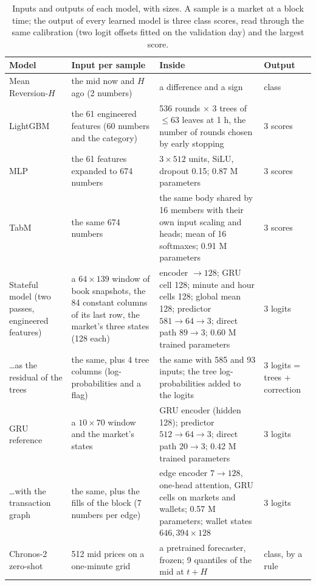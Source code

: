 \begin{table}[t]
\centering
\caption{Inputs and outputs of each model, with sizes.  A sample is a market at a
block time; the output of every learned model is three class scores, read through the same
calibration (two logit offsets fitted on the validation day) and the largest score.}
\label{tab:models:shapes}
\footnotesize
\begin{fittable}\begin{tabular}{p{2.9cm}p{4.0cm}p{5.4cm}p{2.0cm}}
\toprule
Model & Input per sample & Inside & Output \\
\midrule
Mean Reversion-$H$ & the mid now and $H$ ago (2 numbers) & a difference and a sign & class \\
LightGBM & the 61 engineered features (60 numbers and the category) & 536 rounds $\times$ 3 trees of $\le 63$ leaves at 1 h, the number of rounds chosen by early stopping & 3 scores \\
MLP & the 61 features expanded to 674 numbers & $3 \times 512$ units, SiLU, dropout 0.15; 0.87 M parameters & 3 scores \\
TabM & the same 674 numbers & the same body shared by 16 members with their own input scaling and heads; mean of 16 softmaxes; 0.91 M parameters & 3 scores \\
Stateful model (two passes, engineered features) & a $64 \times 139$ window of book snapshots, the 84 constant columns of its last row, the market's three states (128 each) & encoder $\to 128$; GRU cell 128; minute and hour cells 128; global mean 128; predictor $581 \to 64 \to 3$; direct path $89 \to 3$; 0.60 M trained parameters & 3 logits \\
\ldots as the residual of the trees & the same, plus 4 tree columns (log-probabilities and a flag) & the same with 585 and 93 inputs; the tree log-probabilities added to the logits & 3 logits = trees + correction \\
GRU reference & a $10 \times 70$ window and the market's states & GRU encoder (hidden 128); predictor $512 \to 64 \to 3$; direct path $20 \to 3$; 0.42 M trained parameters & 3 logits \\
\ldots with the transaction graph & the same, plus the fills of the block (7 numbers per edge) & edge encoder $7 \to 128$, one-head attention, GRU cells on markets and wallets; 0.57 M parameters; wallet states $646{,}394 \times 128$ & 3 logits \\
Chronos-2 zero-shot & 512 mid prices on a one-minute grid & a pretrained forecaster, frozen; 9 quantiles of the mid at $t + H$ & class, by a rule \\
\bottomrule
\end{tabular}\end{fittable}
\end{table}

